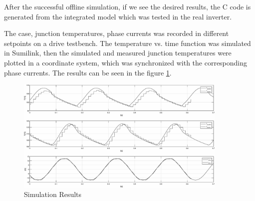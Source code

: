 After the successful offline simulation, if we see the desired results, the C code is generated from the integrated model which was tested in the real inverter.

The case, junction temperatures, phase currents was recorded in different setpoints on a drive testbench. The temperature vs. time function was simulated in Sumilink, then the simulated and measured junction temperatures were  plotted in a coordinate system, which was synchronized with the corresponding phase currents. The results can be seen in the figure \ref{fig:fig_sim}.

\begin{figure}[!h]
\centering
\includegraphics[width=0.9\textwidth]{figures/homerseklet}
\caption{Simulation Results}
\label{fig:fig_sim}
\end{figure}


%
%

